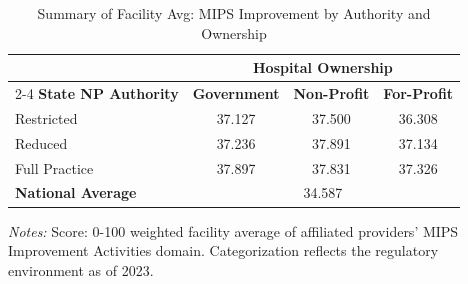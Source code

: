 \begin{table}[htbp]
    \centering
    \caption{Summary of Facility Avg: MIPS Improvement by Authority and Ownership}
    \label{tab:mips_ia_score_own}
    \vspace{0.2cm}
    \begin{tabular}{lccc}
        \toprule
        & \multicolumn{3}{c}{\textbf{Hospital Ownership}} \\
        \cmidrule(lr){2-4}
        \textbf{State NP Authority} & \textbf{Government} & \textbf{Non-Profit} & \textbf{For-Profit} \\
        \midrule
        Restricted & 37.127 & 37.500 & 36.308 \\
        Reduced & 37.236 & 37.891 & 37.134 \\
        Full Practice & 37.897 & 37.831 & 37.326 \\
        \midrule
        \textbf{National Average} & \multicolumn{3}{c}{34.587} \\
        \bottomrule
    \end{tabular}
    \vspace{0.1cm}
    \begin{minipage}{0.85\textwidth}
        \footnotesize \textit{Notes:} Score: 0-100 weighted facility average of affiliated providers' MIPS Improvement Activities domain. Categorization reflects the regulatory environment as of 2023.
    \end{minipage}
\end{table}